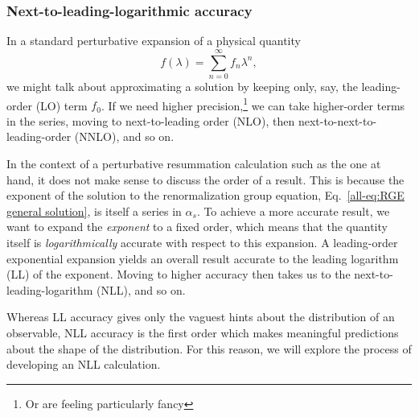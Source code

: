 \documentclass[../thesis.tex]{subfiles}
\begin{document}
\subsubsection{Next-to-leading-logarithmic accuracy}\label{all-sec:NLL resummation}
	In a standard perturbative expansion of a physical quantity
	\begin{equation}
		f(\lambda) = \sum_{n = 0}^\infty f_n \lambda^n,
	\end{equation}
	we might talk about approximating a solution by keeping only, say, the leading-order (LO) term $f_0$. If we need higher precision,\footnote{Or are feeling particularly fancy} we can take higher-order terms in the series, moving to next-to-leading order (NLO), then next-to-next-to-leading-order (NNLO), and so on.

	In the context of a perturbative resummation calculation such as the one at hand, it does not make sense to discuss the order of a result. This is because the exponent of the solution to the renormalization group equation, Eq.~\ref{all-eq:RGE general solution}, is itself a series in $\alpha_s$. To achieve a more accurate result, we want to expand the \textit{exponent} to a fixed order, which means that the quantity itself is \textit{logarithmically} accurate with respect to this expansion. A leading-order exponential expansion yields an overall result accurate to the leading logarithm (LL) of the exponent. Moving to higher accuracy then takes us to the next-to-leading-logarithm (NLL), and so on.

	Whereas LL accuracy gives only the vaguest hints about the distribution of an observable, NLL accuracy is the first order which makes meaningful predictions about the shape of the distribution. For this reason, we will explore the process of developing an NLL calculation.
\end{document}
